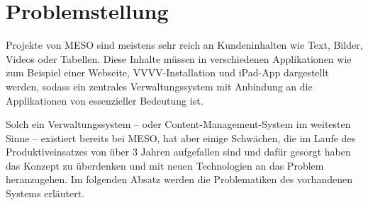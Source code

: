 \section{Problemstellung}
\label{sec:e_problemstellung}

Projekte von MESO sind meistens sehr reich an Kundeninhalten wie Text, Bilder,
Videos oder Tabellen.  Diese Inhalte müssen in verschiedenen Applikationen wie
zum Beispiel einer Webseite, VVVV-Installation und iPad-App dargestellt werden,
sodass ein zentrales Verwaltungssystem mit Anbindung an die Applikationen von
essenzieller Bedeutung ist.

Solch ein Verwaltungssystem -- oder Content-Management-System im weitesten
Sinne -- existiert bereits bei MESO, hat aber einige Schwächen, die im Laufe
des Produktiveinsatzes von über 3 Jahren aufgefallen sind und dafür gesorgt
haben das Konzept zu überdenken und mit neuen Technologien an das Problem
heranzugehen.  Im folgenden Absatz werden die Problematiken des vorhandenen
Systems erläutert.


